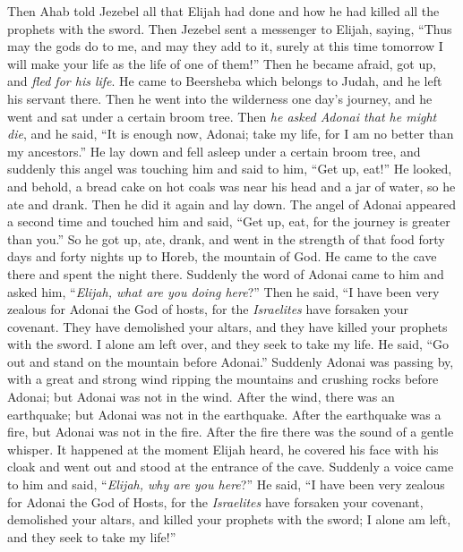 \begin{biblechapter} %
 Then Ahab told Jezebel all that Elijah had done and how he had killed all the prophets with the sword.
\verse Then Jezebel sent a messenger to Elijah, saying, “Thus may the gods do to me, and may they add to it, surely at this time tomorrow I will make your life as the life of one of them!”
\verse Then he became afraid, got up, and \textit{fled for his life}. He came to Beersheba which belongs to Judah, and he left his servant there.
\verse Then he went into the wilderness one day’s journey, and he went and sat under a certain broom tree. Then \textit{he asked Adonai that he might die}, and he said, “It is enough now, Adonai; take my life, for I am no better than my ancestors.”
\verse He lay down and fell asleep under a certain broom tree, and suddenly this angel was touching him and said to him, “Get up, eat!”
\verse He looked, and behold, a bread cake on hot coals was near his head and a jar of water, so he ate and drank. Then he did it again and lay down.
\verse The angel of Adonai appeared a second time and touched him and said, “Get up, eat, for the journey is greater than you.”
\verse So he got up, ate, drank, and went in the strength of that food forty days and forty nights up to Horeb, the mountain of God.
 He came to the cave there and spent the night there. Suddenly the word of Adonai came to him and asked him, “\textit{Elijah, what are you doing here}?”
\verse Then he said, “I have been very zealous for Adonai the God of hosts, for the \textit{Israelites} have forsaken your covenant. They have demolished your altars, and they have killed your prophets with the sword. I alone am left over, and they seek to take my life.
\verse He said, “Go out and stand on the mountain before Adonai.” Suddenly Adonai was passing by, with a great and strong wind ripping the mountains and crushing rocks before Adonai; but Adonai was not in the wind. After the wind, there was an earthquake; but Adonai was not in the earthquake.
\verse After the earthquake was a fire, but Adonai was not in the fire. After the fire there was the sound of a gentle whisper.
\verse It happened at the moment Elijah heard, he covered his face with his cloak and went out and stood at the entrance of the cave. Suddenly a voice came to him and said, “\textit{Elijah, why are you here}?”
\verse He said, “I have been very zealous for Adonai the God of Hosts, for the \textit{Israelites} have forsaken your covenant, demolished your altars, and killed your prophets with the sword; I alone am left, and they seek to take my life!”

\end{biblechapter}
